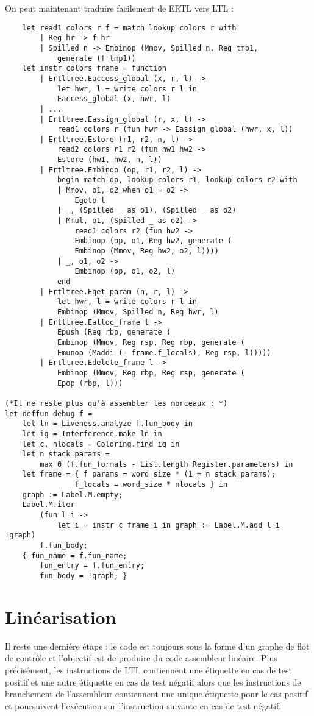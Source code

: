 \documentclass{cours}
\begin{document}
On peut maintenant traduire facilement de ERTL vers LTL : 
\begin{verbatim}
    let read1 colors r f = match lookup colors r with
        | Reg hr -> f hr
        | Spilled n -> Embinop (Mmov, Spilled n, Reg tmp1,
            generate (f tmp1))
    let instr colors frame = function
        | Ertltree.Eaccess_global (x, r, l) ->
            let hwr, l = write colors r l in
            Eaccess_global (x, hwr, l)
        | ...
        | Ertltree.Eassign_global (r, x, l) ->
            read1 colors r (fun hwr -> Eassign_global (hwr, x, l))
        | Ertltree.Estore (r1, r2, n, l) ->
            read2 colors r1 r2 (fun hw1 hw2 ->
            Estore (hw1, hw2, n, l))
        | Ertltree.Embinop (op, r1, r2, l) ->
            begin match op, lookup colors r1, lookup colors r2 with
            | Mmov, o1, o2 when o1 = o2 ->
                Egoto l
            | _, (Spilled _ as o1), (Spilled _ as o2)
            | Mmul, o1, (Spilled _ as o2) ->
                read1 colors r2 (fun hw2 ->
                Embinop (op, o1, Reg hw2, generate (
                Embinop (Mmov, Reg hw2, o2, l))))
            | _, o1, o2 ->
                Embinop (op, o1, o2, l)
            end
        | Ertltree.Eget_param (n, r, l) ->
            let hwr, l = write colors r l in
            Embinop (Mmov, Spilled n, Reg hwr, l)
        | Ertltree.Ealloc_frame l ->
            Epush (Reg rbp, generate (
            Embinop (Mmov, Reg rsp, Reg rbp, generate (
            Emunop (Maddi (- frame.f_locals), Reg rsp, l)))))
        | Ertltree.Edelete_frame l ->
            Embinop (Mmov, Reg rbp, Reg rsp, generate (
            Epop (rbp, l)))

(*Il ne reste plus qu'à assembler les morceaux : *)
let deffun debug f =
    let ln = Liveness.analyze f.fun_body in
    let ig = Interference.make ln in
    let c, nlocals = Coloring.find ig in
    let n_stack_params =
        max 0 (f.fun_formals - List.length Register.parameters) in
    let frame = { f_params = word_size * (1 + n_stack_params);
                f_locals = word_size * nlocals } in
    graph := Label.M.empty;
    Label.M.iter
        (fun l i ->
            let i = instr c frame i in graph := Label.M.add l i !graph)
        f.fun_body;
    { fun_name = f.fun_name;
        fun_entry = f.fun_entry;
        fun_body = !graph; }
\end{verbatim}

\section{Linéarisation}
Il reste une dernière étape : le code est toujours sous la forme d'un graphe de flot de contrôle et l'objectif est de produire du code assembleur linéaire. Plus précisément, les instructions de LTL contiennent une étiquette en cas de test positif et une autre étiquette en cas de test négatif alors que les instructions de branchement de l'assembleur contiennent une unique étiquette pour le cas positif et poursuivent l'exécution sur l'instruction suivante en cas de test négatif.
\end{document}
